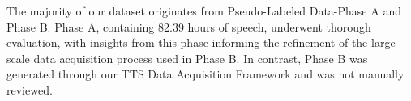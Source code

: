 The majority of our dataset originates from Pseudo-Labeled Data-Phase A and Phase B. Phase A, containing 82.39 hours of speech, underwent thorough evaluation, with insights from this phase informing the refinement of the large-scale data acquisition process used in Phase B. In contrast, Phase B was generated through our TTS Data Acquisition Framework and was not manually reviewed.


